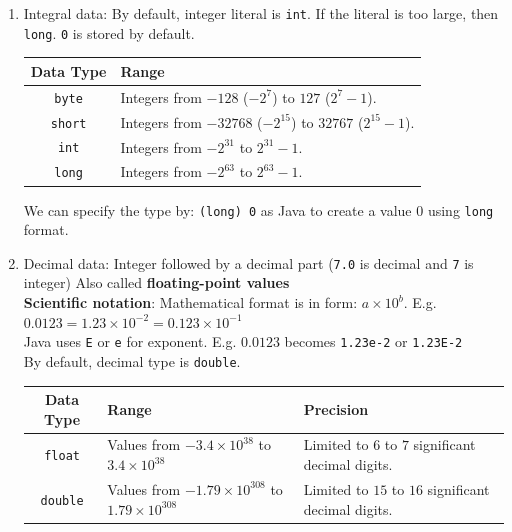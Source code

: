 \documentclass{article}
\begin{document}
\begin{enumerate}
	\item Integral data: By default, integer literal is \texttt{int}. If the literal is too large, then \texttt{long}. \texttt{0} is stored by default.
	
	\begin{table}[h]
		\centering
		\begin{NiceTabular}{||c|l||}
			\hline
			\RowStyle{\bfseries} Data Type & Range\\
			\hline
			\texttt{byte} & Integers from $-128$ ($-2^{7}$) to $127$ ($2^{7}-1$).\\
			\hline
			\texttt{short} & Integers from $-32768$ ($-2^{15}$) to $32767$ ($2^{15}-1$).\\
			\hline
			\texttt{int} & Integers from $-2^{31}$ to $2^{31}-1$.\\
			\hline
			\texttt{long} & Integers from $-2^{63}$ to $2^{63}-1$.\\
			\hline
		\end{NiceTabular}
	\end{table}
	
	We can specify the type by: \texttt{(long) 0} as Java to create a value $0$ using \texttt{long} format.
	\item Decimal data: Integer followed by a decimal part (\texttt{7.0} is decimal and \texttt{7} is integer) Also called \textbf{floating-point values}\\
	\textbf{Scientific notation}: Mathematical format is in form: $a \times 10^{b}$. E.g. $0.0123 = 1.23 \times 10^{-2} = 0.123 \times 10^{-1}$\\
	Java uses \texttt{E} or \texttt{e} for exponent. E.g. $0.0123$ becomes \texttt{1.23e-2} or \texttt{1.23E-2}\\
	By default, decimal type is \texttt{double}.
	
	\begin{table}[h]
		\centering
		\begin{NiceTabular}{||c|l|l||}
			\hline
			\RowStyle{\bfseries}Data Type & Range & Precision\\
			\hline
			\texttt{float} & Values from $-3.4 \times 10^{38}$ to $3.4 \times 10^{38}$ & Limited to $6$ to $7$ significant decimal digits.\\
			\hline
			\texttt{double} & Values from $-1.79 \times 10^{308}$ to $1.79 \times 10^{308}$ & Limited to $15$ to $16$ significant decimal digits.\\
			\hline
		\end{NiceTabular}
	\end{table}
	

\end{enumerate}
\end{document}
